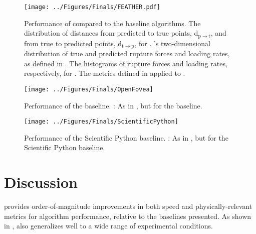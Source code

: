 \begin{figure}[htpb]
\caption[\name{} performance]{\noindent{}Performance of \name{} compared to the baseline algorithms.  The distribution of distances from predicted to true points, d$_{\mathrm{p}\rightarrow\mathrm{t}}$, and from true to predicted points, d$_{\mathrm{t}\rightarrow\mathrm{p}}$, for \name{}.  \name{}'s two-dimensional distribution of true and predicted rupture forces and loading rates, as defined in .  The histograms of rupture forces and loading rates, respectively, for \name{}.   The metrics defined in  applied to \name{}. }
\centering
\texttt{[image: ../Figures/Finals/FEATHER.pdf]}%
\end{figure}

\begin{figure}[htpb]
\caption[\OpenFovea{} performance]{\noindent{}Performance of the \OpenFovea{} baseline. : As in , but for the \OpenFovea{} baseline.}
\centering
\texttt{[image: ../Figures/Finals/OpenFovea]}%
\end{figure}



\begin{figure}[htpb]
\caption[Scientific Python performance]{\noindent{}Performance of the Scientific Python baseline. : As in , but for the Scientific Python baseline. }
\centering
\texttt{[image: ../Figures/Finals/ScientificPython]}%
\end{figure}


\chapter{Discussion}


 \name{} provides order-of-magnitude improvements in both speed and physically-relevant metrics for algorithm performance, relative to the baselines presented. As shown in , \name{} also generalizes well to a wide range of \singlemol{} experimental conditions.  

